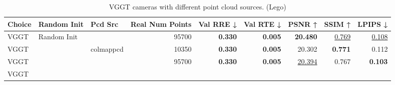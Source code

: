 \begin{table}[H]
\caption{VGGT cameras with different point cloud sources. (Lego)}
\label{tab:06_isolated_cams_vggt_lego}
\begin{tabular}{lllrrrrrr}
\toprule
Choice & Random Init & Pcd Src & Real Num Points & Val RRE ↓ & Val RTE ↓ & PSNR ↑ & SSIM ↑ & LPIPS ↓ \\
\midrule
VGGT & Random Init &  & 95700 & \textbf{0.330} & \textbf{0.005} & \textbf{20.480} & \underline{0.769} & \underline{0.108} \\
VGGT &  & colmappcd & 10350 & \textbf{0.330} & \textbf{0.005} & 20.302 & \textbf{0.771} & 0.112 \\
VGGT &  &  & 95700 & \textbf{0.330} & \textbf{0.005} & \underline{20.394} & 0.767 & \textbf{0.103} \\
VGGT &  &  &  &  &  &  &  &  \\
\bottomrule
\end{tabular}
\end{table}

